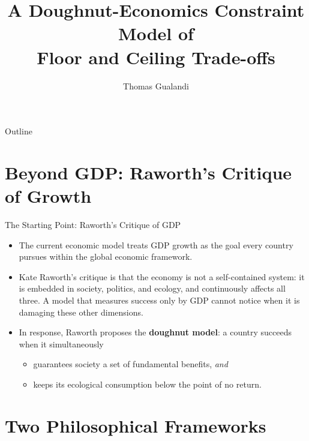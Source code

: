 \documentclass[11pt,aspectratio=169]{beamer}
\title[Doughnut ASP Model]{A Doughnut-Economics Constraint Model of\\ Floor and Ceiling Trade-offs}
\author[T.~Gualandi]{Thomas Gualandi}
\institute[Computational Ethics 2026]{Computational Ethics 2026\\ Prof.~Lagioia \quad Prof.~Giuseppe Pisano}
\date{}
\begin{document}
\begin{frame}
  \titlepage
\end{frame}

\begin{frame}{Outline}
  \small
  \tableofcontents[hideallsubsections]
\end{frame}

\section[GDP Critique]{Beyond GDP: Raworth's Critique of Growth}

\begin{frame}{The Starting Point: Raworth's Critique of GDP}
  \begin{itemize}
    \item The current economic model treats \alert{GDP growth} as the goal every country pursues within the global economic framework.
    \item Kate Raworth's critique is that the economy is \alert{not a self-contained system}: it is embedded in society, politics, and ecology, and continuously affects all three. A model that measures success only by GDP cannot notice when it is damaging these other dimensions.
    \item In response, Raworth proposes the \textbf{doughnut model}: a country succeeds when it simultaneously
    \begin{itemize}
      \item guarantees society a set of fundamental benefits, \emph{and}
      \item keeps its ecological consumption below the point of no return.
    \end{itemize}
  \end{itemize}
\end{frame}

\section[Philosophical Frameworks]{Two Philosophical Frameworks}
\end{document}
